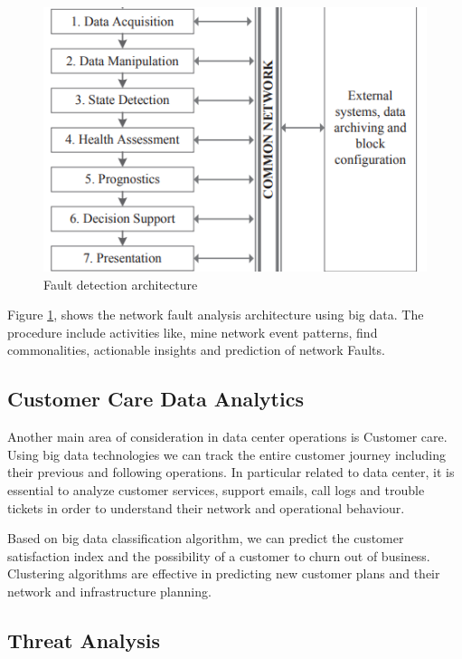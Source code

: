 \documentclass[sigconf]{acmart}
\begin{document}
\begin{figure}[htb]
  \centering
  \includegraphics[width=1.0\columnwidth]{images/Figure4.png}
  \caption{Fault detection architecture 
  \cite{big-data-analytics-for-fault-detection}}
  \label{fig:Figure4} 
\end{figure}

Figure \ref{fig:Figure4}, shows the network fault analysis architecture using big data. The procedure include activities like, mine network event patterns, find commonalities, actionable insights and prediction of network Faults.

\subsection{Customer Care Data Analytics}

Another main area of consideration in data center operations is Customer care. Using big data technologies we can track the entire customer journey including their previous and following operations. In particular related to data center, it is essential to analyze customer services, support emails, call logs and trouble tickets in order to understand their network and operational behaviour. 

Based on big data classification algorithm, we can predict the customer satisfaction index and the possibility of a customer to churn out of business. Clustering algorithms are effective in predicting new customer plans and their network and infrastructure planning.

\subsection{Threat Analysis}
\end{document}
